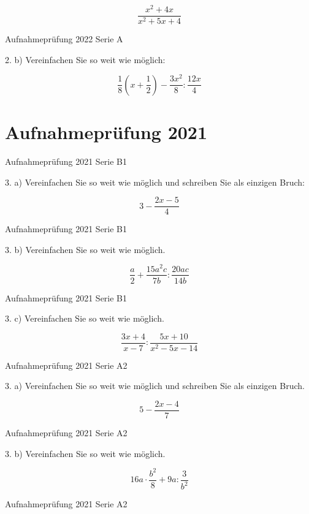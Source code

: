 $$\frac{x^2+4x}{x^2+5x+4}$$

Aufnahmeprüfung 2022 Serie A

2. b) Vereinfachen Sie so weit wie möglich:

$$\frac18\left(x+\frac12\right)  - \frac{3x^2}{8} : \frac{12x}{4}$$

\section*{Aufnahmeprüfung 2021}
Aufnahmeprüfung 2021 Serie B1

3. a) Vereinfachen Sie so weit wie möglich und schreiben Sie als
einzigen Bruch:

$$3-\frac{2x-5}{4}$$

Aufnahmeprüfung 2021 Serie B1

3. b) Vereinfachen Sie so weit wie möglich.

$$\frac{a}2 + \frac{15a^2c}{7b} : \frac{20ac}{14b}$$

Aufnahmeprüfung 2021 Serie B1

3. c) Vereinfachen Sie so weit wie möglich.

$$\frac{3x+4}{x-7} : \frac{5x+10}{x^2-5x-14}$$

Aufnahmeprüfung 2021 Serie A2

3. a) Vereinfachen Sie so weit wie möglich und schreiben Sie als
einzigen Bruch.

$$5-\frac{2x-4}{7}$$

Aufnahmeprüfung 2021 Serie A2

3. b) Vereinfachen Sie so weit wie möglich.

$$16a\cdot{}\frac{b^2}{8} + 9a : \frac{3}{b^2}$$

Aufnahmeprüfung 2021 Serie A2

